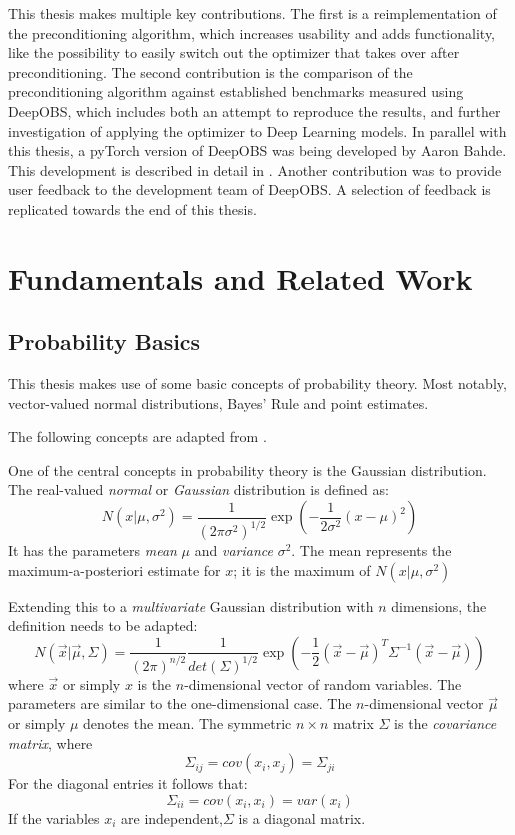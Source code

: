 \documentclass[twoside,12pt,a4paper]{report}
\begin{document}
This thesis makes multiple key contributions. The first is a reimplementation of the preconditioning algorithm, which increases usability and adds functionality, like the possibility to easily switch out the optimizer that takes over after preconditioning. The second contribution is the comparison of the preconditioning algorithm against established benchmarks measured using DeepOBS, which includes both an attempt to reproduce the results, and further investigation of applying the optimizer to Deep Learning models.
In parallel with this thesis, a pyTorch version of DeepOBS was being developed by Aaron Bahde. This development is described in detail in \cite{abahde}. Another contribution was to provide user feedback to the development team of DeepOBS. A selection of feedback is replicated towards the end of this thesis.


\chapter{Fundamentals and Related Work}
\section{Probability Basics}
This thesis makes use of some basic concepts of probability theory. Most notably, vector-valued normal distributions, Bayes' Rule and point estimates.

The following concepts are adapted from \cite{bishop2006pattern}.

One of the central concepts in probability theory is the Gaussian distribution.
The real-valued \textit{normal} or \textit{Gaussian} distribution is defined as:
$$N(x | \mu, \sigma^2) = \frac{1}{(2\pi \sigma^2)^{1/2}} \exp\left(- \frac{1}{2\sigma^2} (x-\mu)^2 \right)$$
It has the parameters \textit{mean} $\mu$ and \textit{variance} $\sigma ^2$.
The mean represents the maximum-a-posteriori estimate for $x$; it is the maximum of $N(x | \mu, \sigma^2)$

Extending this to a \textit{multivariate} Gaussian distribution with $n$ dimensions, the definition needs to be adapted:
$$N(\vec{x} | \vec{\mu}, \Sigma) = \frac{1}{(2\pi)^{n/2}} \frac{1}{det(\Sigma)^{1/2}} \exp\left(-\frac{1}{2} (\vec{x} - \vec{\mu})^T \Sigma ^{-1} (\vec{x} - \vec{\mu})\right)$$
where $\vec{x}$ or simply $x$ is the $n$-dimensional vector of random variables. The parameters are similar to the one-dimensional case. The $n$-dimensional vector $\vec{\mu}$ or simply $\mu$ denotes the mean. The symmetric $n \times n$ matrix $\Sigma$ is the \textit{covariance matrix}, where
$$ \Sigma_{ij} =  cov(x_i, x_j) = \Sigma_{ji}$$
For the diagonal entries it follows that:
$$\Sigma_{ii} = cov(x_i,x_i) = var(x_i)$$
If the variables $x_i$ are independent,$\Sigma$ is a diagonal matrix.
\end{document}
